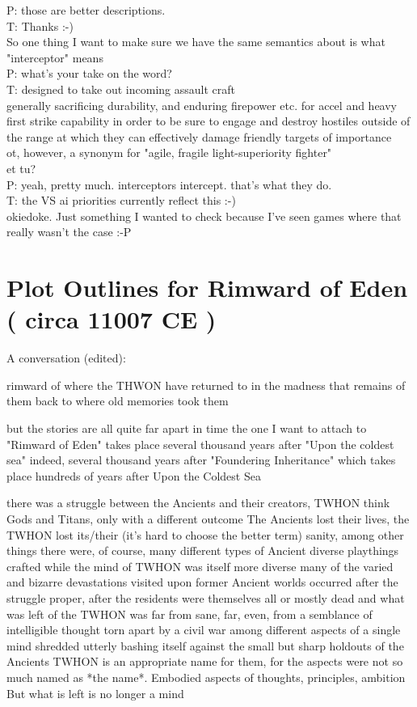 P: those are better descriptions.\\
T: Thanks :-)\\
So one thing I want to make sure we have the same semantics about is what "interceptor" means\\
P: what's your take on the word?\\
T: designed to take out incoming assault craft\\
generally sacrificing durability, and enduring firepower etc. for accel and heavy first strike capability in order to be sure to engage and destroy hostiles outside of the range at which they can effectively damage friendly targets of importance\\
ot, however, a synonym for "agile, fragile light-superiority fighter"\\
et tu?\\
P: yeah, pretty much. interceptors intercept. that's what they do.\\
T: the VS ai priorities currently reflect this :-)\\
okiedoke. Just something I wanted to check because I've seen games where that really wasn't the case :-P\\


\section{Plot Outlines for Rimward of Eden ( circa 11007 CE )}

A conversation (edited):

rimward of where the THWON have returned to
in the madness that remains of them
back to where old memories took them

but the stories are all quite far apart in time
the one I want to attach to "Rimward of Eden" takes place several thousand years after "Upon the coldest sea"
indeed, several thousand years after "Foundering Inheritance"
which takes place hundreds of years after Upon the Coldest Sea

there was a struggle between the Ancients and their creators, TWHON
think Gods and Titans, only with a different outcome
The Ancients lost their lives, the TWHON lost its/their (it's hard to choose the better term) sanity, among other things
there were, of course, many different types of Ancient
diverse playthings crafted while the mind of TWHON was itself more diverse
many of the varied and bizarre devastations visited upon former Ancient worlds occurred after the struggle proper, after the residents were themselves all or mostly dead
and what was left of the TWHON was far from sane, far, even, from a semblance of intelligible thought
torn apart by a civil war among different aspects of a single mind
shredded utterly bashing itself against the small but sharp holdouts of the Ancients
TWHON is an appropriate name for them, for the aspects were not so much named as *the name*. Embodied aspects of thoughts, principles, ambition
But what is left is no longer a mind

